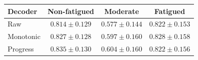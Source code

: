 \begin{tabular}{lccc}
\toprule
Decoder & Non-fatigued & Moderate & Fatigued \\
\midrule
Raw & $0.814 \pm 0.129$ & $0.577 \pm 0.144$ & $0.822 \pm 0.153$ \\
Monotonic & $0.827 \pm 0.128$ & $0.597 \pm 0.160$ & $0.828 \pm 0.158$ \\
Progress & $0.835 \pm 0.130$ & $0.604 \pm 0.160$ & $0.822 \pm 0.156$ \\
\bottomrule
\end{tabular}